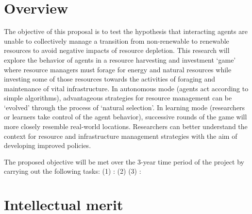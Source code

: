 \documentclass[11pt,a4paper]{article}
\begin{document}




\section*{Overview}
\vspace*{-0.1in}


The objective of this proposal is to test the hypothesis that 
interacting agents are unable to collectively manage 
a transition from non-renewable to renewable resources 
to avoid negative impacts of resource depletion. 
This research will explore the behavior of agents in 
a resource harvesting and investment `game' where 
resource managers must forage for energy and natural resources 
while investing some of those resources towards the activities of 
foraging and maintenance of vital infrastructure. 
In autonomous mode (agents act according to simple algorithms), 
advantageous strategies for resource management can be 
`evolved' through the process of `natural selection'. 
In learning mode (researchers or learners take control of the agent behavior), 
successive rounds of the game will more closely resemble real-world locations. 
Researchers can better understand the context for 
resource and infrastructure management strategies with the aim of developing improved policies.

The proposed objective will be met over the 3-year time period of the project by carrying out the following tasks:
(1)	\emph{}: 	\label{task:}
(2)	\emph{	}	\label{task:}
(3)	\emph{}: 	\label{task:}

\vspace*{-0.1in}
\section*{Intellectual merit}
\vspace*{-0.1in}
\end{document}
